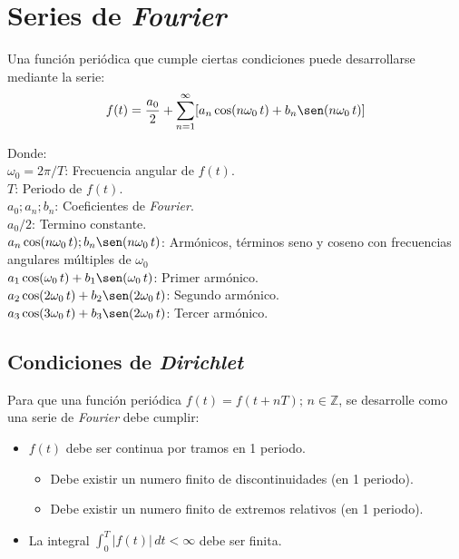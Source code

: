 \section{Series de \emph{Fourier}}
Una función periódica que cumple ciertas condiciones puede desarrollarse
mediante la serie:
\begin{equation}
    f(t)=\frac{a_0}{2}+
    \sum_{n=1}^{\infty}[a_n\cos(n\omega_0\,t)+b_n\sen(n\omega_0\,t)]
\end{equation}

Donde:\\
\indent\indent$\omega_0=2\pi/T$: Frecuencia angular de $f(t)$.\\
\indent\indent$T$: Periodo de $f(t)$.\\
\indent\indent$a_0;a_n;b_n$: Coeficientes de \emph{Fourier}.\\
\indent\indent$a_0/2$: Termino constante.\\
\indent\indent$a_n\cos(n\omega_0\,t);b_n\sen(n\omega_0\,t)$: Armónicos, términos
seno y coseno con frecuencias angulares múltiples de $\omega_0$\\

\indent\indent$a_1\cos(\omega_0\,t)+b_1\sen(\omega_0\,t)$: Primer armónico.\\
\indent\indent$a_2\cos(2\omega_0\,t)+b_2\sen(2\omega_0\,t)$: Segundo armónico.\\
\indent\indent$a_3\cos(3\omega_0\,t)+b_3\sen(2\omega_0\,t)$: Tercer armónico.\\

\subsection{Condiciones de \emph{Dirichlet}}
Para que una función periódica $f(t)=f(t+nT);\,n\in\mathbb{Z}$, se desarrolle
como una serie de \emph{Fourier} debe cumplir:

\begin{itemize}
\item $f(t)$ debe ser continua por tramos en 1 periodo.
    \begin{figure}[H]
        \centering
        
    \end{figure}
    \begin{itemize}
    \item Debe existir un numero finito de discontinuidades (en 1 periodo).
    \item Debe existir un numero finito de extremos relativos (en 1 periodo).
    \end{itemize}
\item La integral $\int_0^T|f(t)|\,dt<\infty$ debe ser finita.
\end{itemize}

